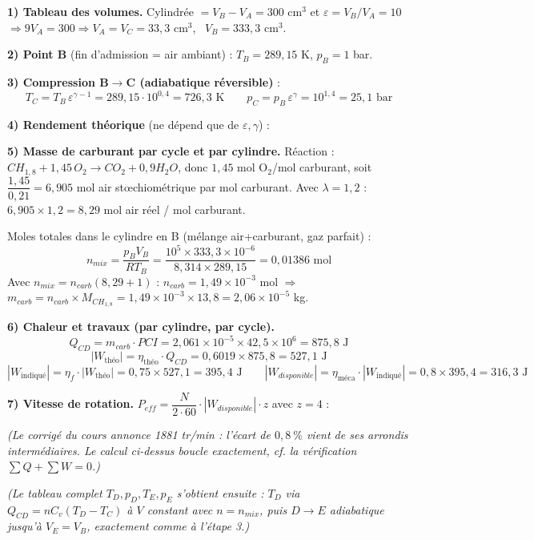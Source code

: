 \begin{correction}
\textbf{1) Tableau des volumes.} Cylindrée $=V_B-V_A=300\text{ cm}^3$ et $\varepsilon=V_B/V_A=10$
$\Rightarrow 9V_A=300 \Rightarrow V_A=V_C=33{,}3\text{ cm}^3$, \ $V_B=333{,}3\text{ cm}^3$.

\textbf{2) Point B} (fin d'admission = air ambiant) : $T_B=289{,}15$ K, $p_B=1$ bar.

\textbf{3) Compression B$\to$C (adiabatique réversible)} :
\[T_C=T_B\,\varepsilon^{\gamma-1}=289{,}15\cdot 10^{0{,}4}=726{,}3\text{ K}\qquad
p_C=p_B\,\varepsilon^{\gamma}=10^{1{,}4}=25{,}1\text{ bar}\]

\textbf{4) Rendement théorique} (ne dépend que de $\varepsilon,\gamma$) :

\textbf{5) Masse de carburant par cycle et par cylindre.} Réaction : $CH_{1,8}+1{,}45\,O_2 \to CO_2+0{,}9H_2O$,
donc $1{,}45$ mol O$_2$/mol carburant, soit $\dfrac{1{,}45}{0{,}21}=6{,}905$ mol air stœchiométrique par mol
carburant. Avec $\lambda=1{,}2$ : $6{,}905\times 1{,}2=8{,}29$ mol air réel / mol carburant.

Moles totales dans le cylindre en B (mélange air+carburant, gaz parfait) :
\[n_{mix}=\frac{p_BV_B}{RT_B}=\frac{10^5\times 333{,}3\times10^{-6}}{8{,}314\times 289{,}15}=0{,}01386\text{ mol}\]
Avec $n_{mix}=n_{carb}(8{,}29+1)$ : $n_{carb}=1{,}49\times10^{-3}$ mol $\Rightarrow$
$m_{carb}=n_{carb}\times M_{CH_{1,8}}=1{,}49\times10^{-3}\times13{,}8=2{,}06\times10^{-5}$ kg.

\textbf{6) Chaleur et travaux (par cylindre, par cycle).}
\[Q_{CD}=m_{carb}\cdot PCI = 2{,}061\times10^{-5}\times 42{,}5\times10^{6}=875{,}8\text{ J}\]
\[|W_{\text{théo}}|=\eta_{\text{théo}}\cdot Q_{CD}=0{,}6019\times875{,}8=527{,}1\text{ J}\]
\[|W_{\text{indiqué}}|=\eta_f\cdot|W_{\text{théo}}|=0{,}75\times527{,}1=395{,}4\text{ J} \qquad
|W_{disponible}|=\eta_{\text{méca}}\cdot|W_{\text{indiqué}}|=0{,}8\times395{,}4=316{,}3\text{ J}\]

\textbf{7) Vitesse de rotation.} $P_{eff}=\dfrac{N}{2\cdot 60}\cdot|W_{disponible}|\cdot z$ avec $z=4$ :

\emph{(Le corrigé du cours annonce 1881 tr/min : l'écart de $0{,}8\ \%$ vient de ses arrondis
intermédiaires. Le calcul ci-dessus boucle exactement, cf. la vérification $\sum Q+\sum W=0$.)}

\emph{(Le tableau complet $T_D,p_D,T_E,p_E$ s'obtient ensuite : $T_D$ via $Q_{CD}=nC_v(T_D-T_C)$ à $V$
constant avec $n=n_{mix}$, puis $D\to E$ adiabatique jusqu'à $V_E=V_B$, exactement comme à l'étape 3.)}
\end{correction}
